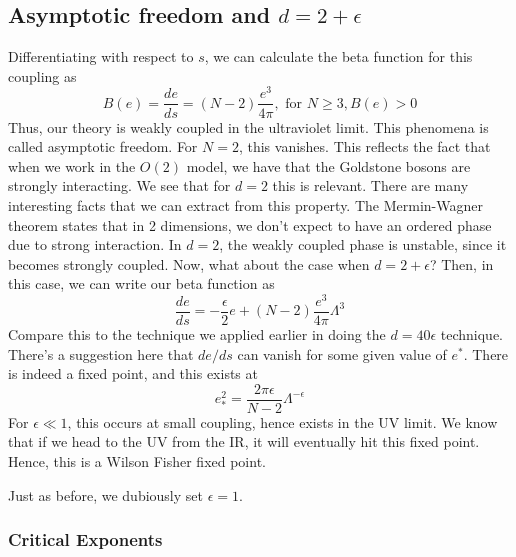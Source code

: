 \subsection{Asymptotic freedom and $ d = 2 + \epsilon $ } 

Differentiating with respect to $ s $, we 
can calculate the beta function for this coupling as 
\[
B ( e) = \frac{de }{ ds }  = ( N - 2) \frac{e ^ 3 }{ 4 \pi }, \text{ for } N \geq 3, B ( e) > 0 
\] Thus, our theory is weakly coupled in the ultraviolet limit. 
This phenomena is called asymptotic freedom. 
For $ N = 2 $, this vanishes. This reflects the 
fact that when we work in the $ O ( 2) $ model, 
we have that the Goldstone bosons are strongly interacting.  
We see that for $ d = 2 $ this is relevant. 
There are many interesting facts that we can extract from this property. 
The Mermin-Wagner theorem states that in 2 dimensions, we don't expect to have an ordered phase
due to strong interaction. 
In $ d = 2$, the weakly coupled phase is unstable, since 
it becomes strongly coupled. 
Now, what about the case when $ d  = 2 + \epsilon $? Then, 
in this case, we can write our beta function as 
\[
\frac{de }{ ds } =  - \frac{\epsilon }{ 2  } e + ( N -2 ) \frac{e ^ 3 }{ 4 \pi } \Lambda ^ 3 
\] Compare this to the technique we applied 
earlier in doing the $ d = 4  0 \epsilon $ technique. 
There's a suggestion here that $ de / ds  $ can vanish 
for some given value of $ e ^ * $. There is indeed 
a fixed point, and this exists at 
\[
e_{ * } ^ 2  = \frac{ 2 \pi \epsilon }{ N - 2 } \Lambda ^{ - \epsilon }
\] For  $ \epsilon \ll 1 $, this occurs at 
small coupling, hence exists in the UV limit. 
We know that if we head to the UV from the IR, 
it will eventually hit this fixed point. Hence, this is 
a Wilson Fisher fixed point. 

Just as before, we dubiously set $ \epsilon = 1$. 

\subsubsection{Critical Exponents} 

